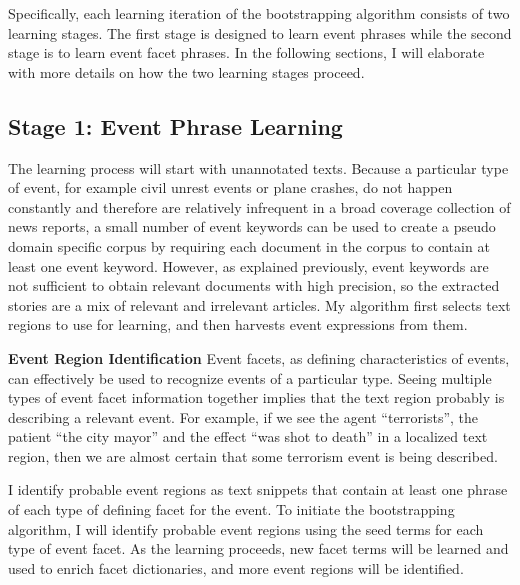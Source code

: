 Specifically, each learning iteration of the bootstrapping algorithm 
consists of two learning stages.
The first stage is designed to learn event phrases 
while the second stage is to learn event facet phrases.
In the following sections, I will elaborate with more details 
on how 
the two learning stages proceed.

\subsection{Stage 1: Event Phrase Learning}
The learning process will start with unannotated texts.
Because a particular type of event, for example 
civil unrest events or plane crashes, 
do not happen constantly and  
 therefore are relatively infrequent 
in a broad coverage collection of news reports, 
a small 
number of event keywords can be used to create 
a pseudo domain specific corpus by requiring each document 
in the corpus to contain at least one event keyword. 
However, as explained 
previously, event keywords are not sufficient to 
obtain relevant documents with high precision, so the extracted stories
are a mix of relevant and irrelevant articles. 
My algorithm first selects text regions to use for learning, and then
 harvests event expressions from them. 

\vspace{.1in}
\textbf{Event Region Identification}
\vspace{.1in}
Event facets, as defining characteristics of 
events, can effectively be used to recognize events of a particular type.  
Seeing multiple types of event facet information together 
implies that the text region probably is describing a relevant event. 
For example, if we see the agent ``terrorists'', 
the patient ``the city mayor'' and the effect ``was shot to death'' 
in a localized text region, 
then we are almost certain that some terrorism event 
is being described. 

I identify probable event regions as text snippets that 
 contain at least one phrase of each type of defining facet for the event.
To initiate the bootstrapping algorithm, I will identify 
 probable event regions using the seed terms for each type 
of event facet. 
As the learning proceeds, 
new facet terms will be learned and used to enrich facet dictionaries, 
and more event regions will be identified. 

